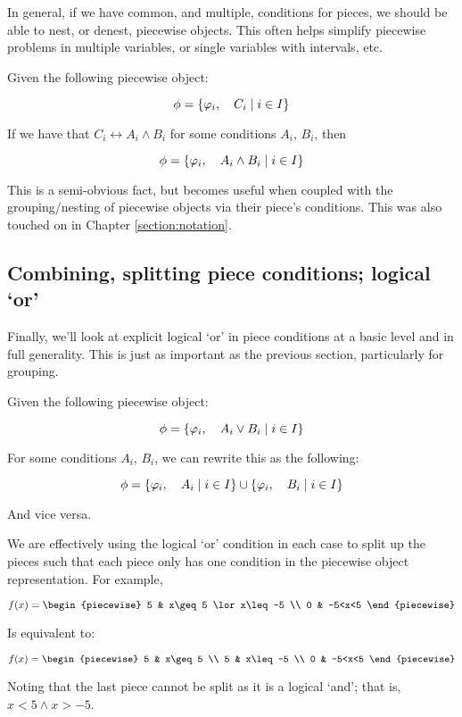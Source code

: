 In general, if we have common, and multiple, conditions for pieces, we should be able to nest, or denest, piecewise objects. This often helps simplify piecewise problems in multiple variables, or single variables with intervals, etc.

\begin{theorem}
    Given the following piecewise object:
    
    $$
        \phi=\{\varphi_i,\quad C_i\mid i\in I\}
    $$
    
    If we have that $C_i\leftrightarrow A_i\land B_i$ for some conditions $A_i$, $B_i$, then

    $$
        \phi=\{\varphi_i,\quad A_i\land B_i\mid i\in I\}
    $$

    This is a semi-obvious fact, but becomes useful when coupled with the grouping/nesting of piecewise objects via their piece's conditions. This was also touched on in Chapter \ref{section:notation}.
\end{theorem}
\subsection{Combining, splitting piece conditions; logical `or'}
Finally, we'll look at explicit logical `or' in piece conditions at a basic level and in full generality. This is just as important as the previous section, particularly for grouping.

\begin{theorem}
    Given the following piecewise object:

    $$
        \phi=\{\varphi_i,\quad A_i\lor B_i\mid i\in I\}
    $$

    For some conditions $A_i$, $B_i$, we can rewrite this as the following:

    $$
        \phi=\{\varphi_i,\quad A_i\mid i\in I\}\cup\{\varphi_i,\quad B_i\mid i\in I\}
    $$

    And vice versa.

    We are effectively using the logical `or' condition in each case to split up the pieces such that each piece only has one condition in the piecewise object representation. For example,

    $$
        f(x) = \begin{piecewise}
            5 & x\geq 5 \lor x\leq -5 \\
            0 & -5<x<5
        \end{piecewise}
    $$

    Is equivalent to:

    $$
        f(x) = \begin{piecewise}
            5 & x\geq 5 \\
            5 & x\leq -5 \\
            0 & -5<x<5
        \end{piecewise}
    $$

    Noting that the last piece cannot be split as it is a logical `and'; that is, $x<5\land x>-5$.
\end{theorem}

